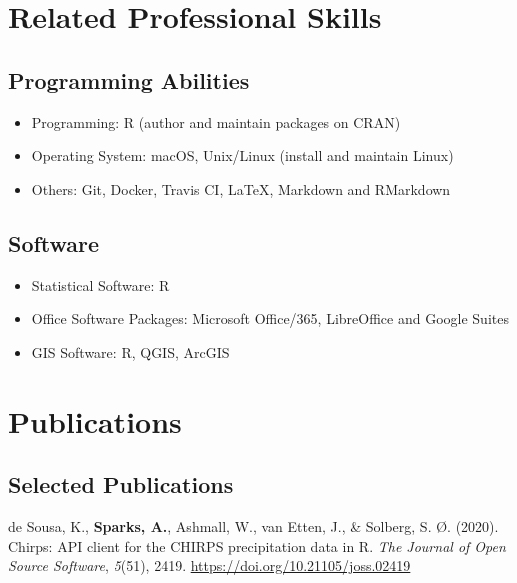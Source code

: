 \documentclass[11pt, a4paper]{awesome-cv}
\providecommand{\tightlist}{%
	\setlength{\itemsep}{0pt}\setlength{\parskip}{0pt}}
\begin{document}
\hypertarget{related-professional-skills}{%
\section{Related Professional
Skills}\label{related-professional-skills}}

\hypertarget{programming-abilities}{%
\subsection{Programming Abilities}\label{programming-abilities}}

\begin{itemize}
\tightlist
\item
  Programming: R (author and maintain packages on CRAN)
\item
  Operating System: macOS, Unix/Linux (install and maintain Linux)
\item
  Others: Git, Docker, Travis CI, LaTeX, Markdown and RMarkdown
\end{itemize}

\hypertarget{software}{%
\subsection{Software}\label{software}}

\begin{itemize}
\tightlist
\item
  Statistical Software: R
\item
  Office Software Packages: Microsoft Office/365, LibreOffice and Google
  Suites
\item
  GIS Software: R, QGIS, ArcGIS
\end{itemize}

\hypertarget{publications}{%
\section{Publications}\label{publications}}

\hypertarget{selected-publications}{%
\subsection{Selected Publications}\label{selected-publications}}

\begingroup
\setlength{\parindent}{-0.5in}
\setlength{\leftskip}{0.5in}

\hypertarget{refs_articles}{}
\leavevmode{}%
de Sousa, K., \textbf{Sparks, A.}, Ashmall, W., van Etten, J., \&
Solberg, S. Ø. (2020). Chirps: {API} client for the CHIRPS precipitation
data in {R}. \emph{The Journal of Open Source Software}, \emph{5}(51),
2419. \url{https://doi.org/10.21105/joss.02419}
\end{document}
